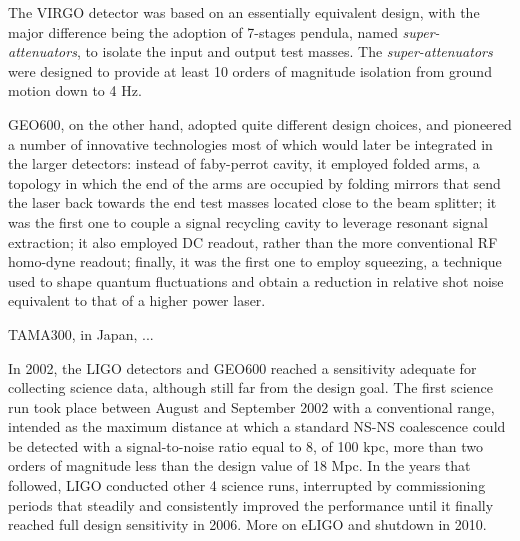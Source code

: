 The VIRGO detector was based on an essentially equivalent design, with the major difference being the adoption of 7-stages pendula, named \textit{super-attenuators}, to isolate the input and output test masses. The \textit{super-attenuators} were designed to provide at least 10 orders of magnitude isolation from ground motion down to 4 Hz.

GEO600, on the other hand, adopted quite different design choices, and pioneered a number of innovative technologies most of which would later be integrated in the larger detectors: instead of faby-perrot cavity, it employed folded arms, a topology in which the end of the arms are occupied by folding mirrors that send the laser back towards the end test masses located close to the beam splitter; it was the first one to couple a signal recycling cavity to leverage resonant signal extraction; it also employed DC readout, rather than the more conventional RF homo-dyne readout; finally, it was the first one to employ squeezing, a technique used to shape quantum fluctuations and obtain a reduction in relative shot noise equivalent to that of a higher power laser.


TAMA300, in Japan, ...

In 2002, the LIGO detectors and GEO600 reached a sensitivity adequate for collecting science data, although still far from the design goal. 
The first science run took place between August and September 2002 with a conventional range, intended as the maximum distance at which a standard NS-NS coalescence could be detected with a signal-to-noise ratio equal to 8, of 100 kpc, more than two orders of magnitude less than the design value of 18 Mpc. In the years that followed, LIGO conducted other 4 science runs, interrupted by commissioning periods that steadily and consistently improved the performance until it finally reached full design sensitivity in 2006. More on eLIGO and shutdown in 2010.






